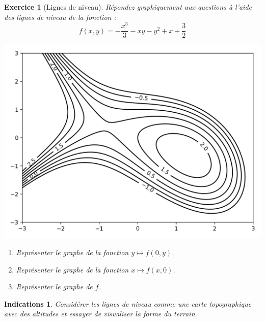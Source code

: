 \documentclass[11pt,a4paper]{article}
\theoremstyle{exostyle}
\newtheorem{exo}{Exercice}
\newtheorem{ind}{Indications}
\newcommand{\exercice}[1]{} \newcommand{\finexercice}{}
\newcommand{\enonce}{\begin{exo}} \newcommand{\finenonce}{\end{exo}}
\newcommand{\indication}{\begin{ind}} \newcommand{\finindication}{\end{ind}}
\begin{document}
\fincorrection
\finexercice


\exercice{}
\enonce[Lignes de niveau]
Répondez graphiquement aux questions à l’aide des lignes de niveau de la fonction :
$$f(x,y) = -\frac{x^3}{3} - xy - y^2 + x + \frac32$$

\begin{center}
\includegraphics[scale=0.7]{figures-exercices/fonction-niveaux}
\end{center}

\begin{enumerate}
	\item Représenter le graphe de la fonction $y \mapsto f(0,y)$.	
	\item Représenter le graphe de la fonction $x \mapsto f(x,0)$.
	\item Représenter le graphe de $f$.
\end{enumerate}

\finenonce


\indication
Considérer les lignes de niveau comme une carte topographique avec des altitudes et essayer de visualiser la forme du terrain.
\finindication
\end{document}
